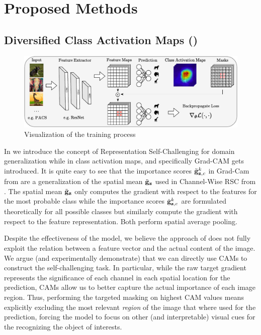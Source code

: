 \chapter{Proposed Methods}

\section{Diversified Class Activation Maps (\divcam)}
\label{sec:divcam}

\begin{figure}[t]
    \centering
    \includegraphics[width=\textwidth]{Figures/Chapter4/model_figure-cropped.pdf}
    \caption{Visualization of the \divcam training process}
    \label{fig:divcam-overview}
\end{figure}


In  we introduce the concept of Representation Self-Challenging for domain generalization while in  class activation maps, and specifically Grad-CAM gets introduced. It is quite easy to see that the importance scores $ \Tilde{\mathbf{g}}_{\mathbf{z},c}^k$ in Grad-Cam from  are a generalization of the spatial mean $\Tilde{\mathbf{g}}_\mathbf{z}$ used in Channel-Wise RSC from . The spatial mean $\Tilde{\mathbf{g}}_\mathbf{z}$ only computes the gradient with respect to the features for the most probable class while the importance scores $ \Tilde{\mathbf{g}}_{\mathbf{z},c}^k$ are formulated theoretically for all possible classes but similarly compute the gradient with respect to the feature representation. Both perform spatial average pooling.  

Despite the effectiveness of the model, we believe the approach of \citet{huang2020selfchallenging} does not fully exploit the relation between a feature vector and the actual content of the image. We argue (and experimentally demonstrate) that we can directly use CAMs to construct the self-challenging task. In particular, while the raw target gradient represents the significance of each channel in each spatial location for the prediction, CAMs allow us to better capture the actual importance of each image region. Thus, performing the targeted masking on highest CAM values means explicitly excluding the most relevant \emph{region} of the image that where used for the prediction, forcing the model to focus on other (and interpretable) visual cues for the recognizing the object of interests. 

